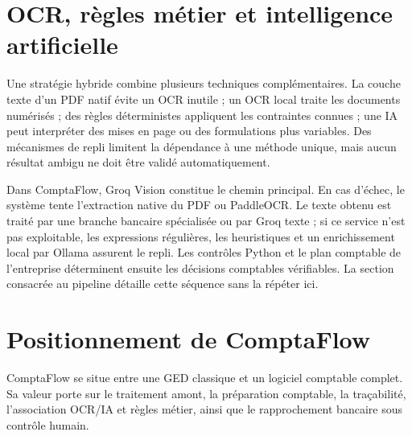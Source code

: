 \documentclass[12pt,a4paper,oneside]{report}
\begin{document}
\section{OCR, règles métier et intelligence artificielle}

Une stratégie hybride combine plusieurs techniques complémentaires. La couche
texte d'un PDF natif évite un OCR inutile ; un OCR local traite les documents
numérisés ; des règles déterministes appliquent les contraintes connues ; une
IA peut interpréter des mises en page ou des formulations plus variables. Des
mécanismes de repli limitent la dépendance à une méthode unique, mais aucun
résultat ambigu ne doit être validé automatiquement.

Dans ComptaFlow, Groq Vision constitue le chemin principal. En cas d'échec, le
système tente l'extraction native du PDF ou PaddleOCR. Le texte obtenu est
traité par une branche bancaire spécialisée ou par Groq texte ; si ce service
n'est pas exploitable, les expressions régulières, les heuristiques et un
enrichissement local par Ollama assurent le repli\cite{paddleocr,groq,ollama}.
Les contrôles Python et le plan comptable de l'entreprise déterminent
ensuite les décisions comptables vérifiables. La section consacrée au pipeline
détaille cette séquence sans la répéter ici.

\section{Positionnement de ComptaFlow}

ComptaFlow se situe entre une GED classique et un logiciel comptable complet.
Sa valeur porte sur le traitement amont, la préparation comptable, la
traçabilité, l'association OCR/IA et règles métier, ainsi que le rapprochement
bancaire sous contrôle humain.
\end{document}
